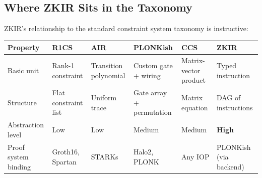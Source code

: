 \documentclass[
  11pt,
  openany]{report}
\renewcommand{\textbf}[1]{{\bfseries\color{MidnightBold}#1}}
\begin{document}
\subsection{Where ZKIR Sits in the
Taxonomy}\label{where-zkir-sits-in-the-taxonomy}

ZKIR's relationship to the standard constraint system taxonomy is instructive:

\begin{longtable}[]{@{}
  >{\raggedright\arraybackslash}p{}
  >{\raggedright\arraybackslash}p{}
  >{\raggedright\arraybackslash}p{}
  >{\raggedright\arraybackslash}p{}
  >{\raggedright\arraybackslash}p{}
  >{\raggedright\arraybackslash}p{}@{}}
\toprule\noalign{}
\begin{minipage}[b]{\linewidth}\raggedright
Property
\end{minipage} & \begin{minipage}[b]{\linewidth}\raggedright
R1CS
\end{minipage} & \begin{minipage}[b]{\linewidth}\raggedright
AIR
\end{minipage} & \begin{minipage}[b]{\linewidth}\raggedright
PLONKish
\end{minipage} & \begin{minipage}[b]{\linewidth}\raggedright
CCS
\end{minipage} & \begin{minipage}[b]{\linewidth}\raggedright
ZKIR
\end{minipage} \\
\midrule\noalign{}
\arrayrulecolor{MidnightBlue}\midrule\arrayrulecolor{MidnightBorder}
\endhead
\bottomrule\noalign{}
\endlastfoot
Basic unit & Rank-1 constraint & Transition polynomial & Custom gate + wiring &
Matrix-vector product & Typed instruction \\
Structure & Flat constraint list & Uniform trace & Gate array + permutation &
Matrix equation & DAG of instructions \\
Abstraction level & Low & Low & Medium & Medium & \textbf{High} \\
Proof system binding & Groth16, Spartan & STARKs & Halo2, PLONK & Any IOP &
PLONKish (via backend) \\
\end{longtable}
\end{document}
